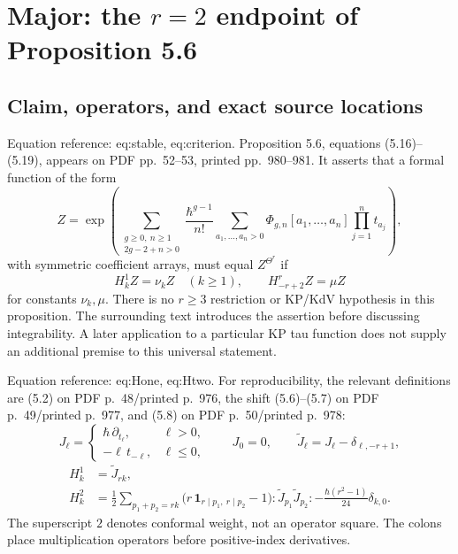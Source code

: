 \documentclass[10pt]{article}
\begin{document}
\section*{Major: the \(r=2\) endpoint of Proposition 5.6}
\subsection*{Claim, operators, and exact source locations}
Equation reference: eq:stable, eq:criterion. Proposition 5.6, equations (5.16)–(5.19), appears on PDF pp. 52–53, printed pp. 980–981. It asserts that a formal function of the form \[
 Z=\exp\!\left(
 \sum_{\substack{g\ge0,\ n\ge1\\2g-2+n>0}}
 \frac{\hbar^{g-1}}{n!}
 \sum_{a_1,\ldots,a_n>0}
 \Phi_{g,n}[a_1,\ldots,a_n]\prod_{j=1}^n t_{a_j}
 \right),\] with symmetric coefficient arrays, must equal \(Z^{\Theta^r}\) if \[
 H_k^1Z=\nu_kZ\quad(k\ge1),\qquad
 H_{-r+2}^{r}Z=\mu Z\] for constants \(\nu_k,\mu\). There is no \(r\ge3\) restriction or KP/KdV hypothesis in this proposition. The surrounding text introduces the assertion before discussing integrability. A later application to a particular KP tau function does not supply an additional premise to this universal statement.\par
Equation reference: eq:Hone, eq:Htwo. For reproducibility, the relevant definitions are (5.2) on PDF p. 48/printed p. 976, the shift (5.6)–(5.7) on PDF p. 49/printed p. 977, and (5.8) on PDF p. 50/printed p. 978: \[J_\ell=
 \begin{cases}
 \hbar\,\partial_{t_\ell},&\ell>0,\\
 -\ell\,t_{-\ell},&\ell\le0,
 \end{cases}
 \qquad J_0=0,\qquad
 \widetilde J_\ell=J_\ell-\delta_{\ell,-r+1},\] \[\begin{aligned}
 H_k^1&=\widetilde J_{rk},\\
 H_k^2&=\frac12\sum_{p_1+p_2=rk}
 \bigl(r\,\mathbf1_{r\mid p_1,\ r\mid p_2}-1\bigr)
 :\widetilde J_{p_1}\widetilde J_{p_2}:
 -\frac{\hbar(r^2-1)}{24}\delta_{k,0}.
 \end{aligned}\] The superscript \(2\) denotes conformal weight, not an operator square. The colons place multiplication operators before positive-index derivatives.\par
\end{document}
